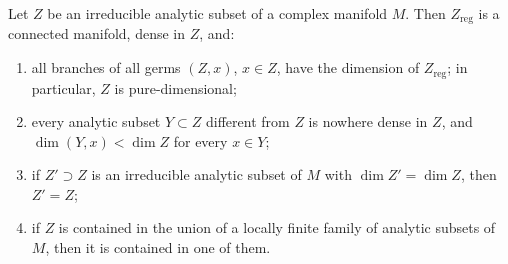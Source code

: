 \begin{corollary}\label{cor:irreducible-analytic-sets}
Let $Z$ be an irreducible analytic subset of a complex manifold $M$. Then $Z_{\mathrm{reg}}$ is a connected manifold, dense in $Z$, and:
\begin{enumerate}
\item all branches of all germs $(Z,x)$, $x\in Z$, have the dimension of $Z_{\mathrm{reg}}$; in particular, $Z$ is pure-dimensional;
\item every analytic subset $Y\subset Z$ different from $Z$ is nowhere dense in $Z$, and $\dim(Y,x)<\dim Z$ for every $x\in Y$;
\item if $Z'\supset Z$ is an irreducible analytic subset of $M$ with $\dim Z'=\dim Z$, then $Z'=Z$;
\item if $Z$ is contained in the union of a locally finite family of analytic subsets of $M$, then it is contained in one of them.
\end{enumerate}
\end{corollary}
